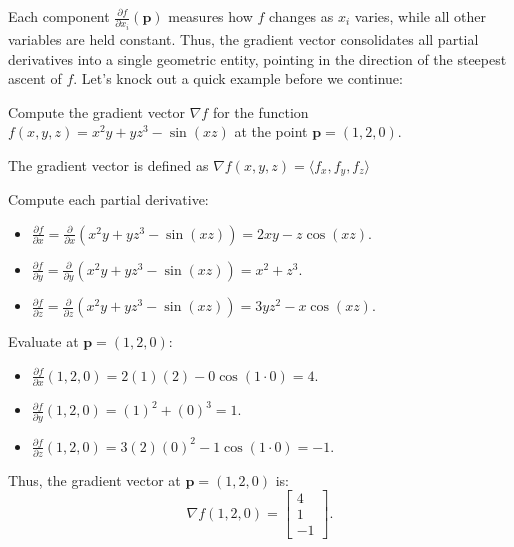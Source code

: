 \noindent Each component \( \frac{\partial f}{\partial x_i}(\mathbf{p}) \) measures how \( f \) changes as \( x_i \) varies, while all other variables are held constant. Thus, the gradient vector consolidates all partial derivatives into a single geometric entity, pointing in the direction of the steepest ascent of \( f \). Let's knock out a quick example before we continue:


\exampleline
\begin{example}
Compute the gradient vector \( \nabla f \) for the function \( f(x, y, z) = x^2y + yz^3 - \sin(xz) \) at the point \( \mathbf{p} = (1, 2, 0) \).

\begin{solution}
The gradient vector is defined as $\nabla f(x, y, z) = \langle f_x,f_y,f_z \rangle$

Compute each partial derivative:
\begin{itemize}
    \item \( \frac{\partial f}{\partial x} = \frac{\partial}{\partial x} \left( x^2y + yz^3 - \sin(xz) \right) = 2xy - z\cos(xz). \)
    \item \( \frac{\partial f}{\partial y} = \frac{\partial}{\partial y} \left( x^2y + yz^3 - \sin(xz) \right) = x^2 + z^3. \)
    \item \( \frac{\partial f}{\partial z} = \frac{\partial}{\partial z} \left( x^2y + yz^3 - \sin(xz) \right) = 3yz^2 - x\cos(xz). \)
\end{itemize}

Evaluate at \( \mathbf{p} = (1, 2, 0) \):
\begin{itemize}
    \item \( \frac{\partial f}{\partial x}(1, 2, 0) = 2(1)(2) - 0\cos(1 \cdot 0) = 4. \)
    \item \( \frac{\partial f}{\partial y}(1, 2, 0) = (1)^2 + (0)^3 = 1. \)
    \item \( \frac{\partial f}{\partial z}(1, 2, 0) = 3(2)(0)^2 - 1\cos(1 \cdot 0) = -1. \)
\end{itemize}

Thus, the gradient vector at \( \mathbf{p} = (1, 2, 0) \) is:
\[
\nabla f(1, 2, 0) = \begin{bmatrix} 4 \\ 1 \\ -1 \end{bmatrix}.
\]
\end{solution}
\end{example}
\exampleline



